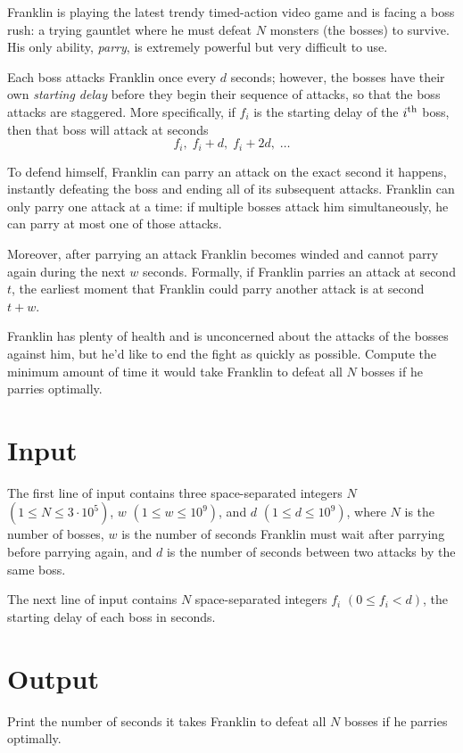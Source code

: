
\newcommand{\amaxn}{3 \cdot 10^{5}}
\newcommand{\amaxd}{10^{9}}
\newcommand{\amaxk}{10^{9}}

Franklin is playing the latest trendy timed-action video game and is facing a boss rush: a trying gauntlet where he must defeat $N$ monsters (the bosses) to survive. His only ability, \textit{parry}, is extremely powerful but very difficult to use.

Each boss attacks Franklin once every $d$ seconds; however, the bosses have their own \emph{starting delay} before they begin their sequence of attacks, so that the boss attacks are staggered. More specifically, if $f_i$ is the starting delay of the $i\textsuperscript{th}$ boss, then that boss will attack at seconds
\[
f_i, \; f_i + d, \; f_i + 2d, \; \ldots
\]

To defend himself, Franklin can parry an attack on the exact second it happens, instantly defeating the boss and ending all of its subsequent attacks. Franklin can only parry one attack at a time: if multiple bosses attack him simultaneously, he can parry at most one of those attacks.

Moreover, after parrying an attack Franklin becomes winded and cannot parry again during the next $w$ seconds. Formally, if Franklin parries an attack at second $t$, the earliest moment that Franklin could parry another attack is at second $t+w$.

Franklin has plenty of health and is unconcerned about the attacks of the bosses against him, but he'd like to end the fight as quickly as possible. Compute the minimum amount of time it would take Franklin to defeat all $N$ bosses if he parries optimally.

\section*{Input}
The first line of input contains three space-separated integers $N$ $(1 \leq N \leq \amaxn)$, $w$ $(1 \leq w \leq \amaxk)$, and $d$ $(1 \leq d \leq \amaxd)$, where $N$ is the number of bosses, $w$ is the number of seconds Franklin must wait after parrying before parrying again, and $d$ is the number of seconds between two attacks by the same boss.

The next line of input contains $N$ space-separated integers $f_i$ $(0 \leq f_i < d)$, the starting delay of each boss in seconds.

\section*{Output}
Print the number of seconds it takes Franklin to defeat all $N$ bosses if he parries optimally. 

